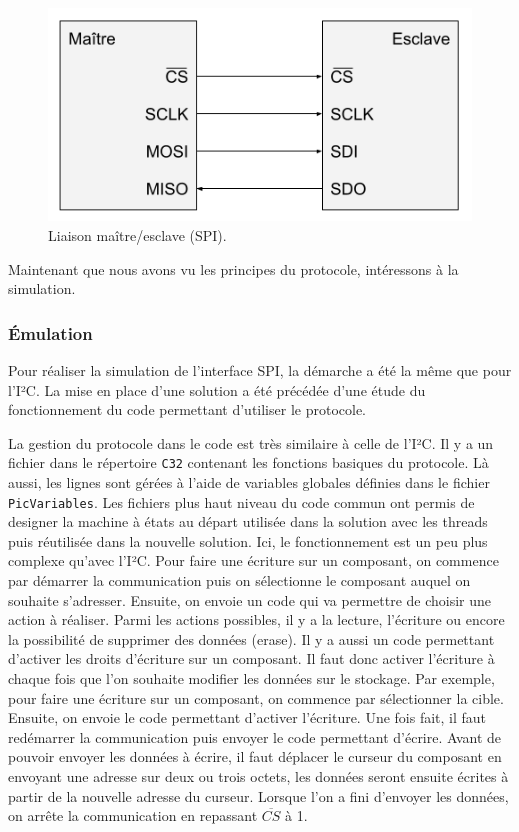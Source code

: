 \documentclass[a4paper]{article}
\begin{document}
\begin{figure}[h!]
  \begin{center}
    \includegraphics[scale=0.6]{./img/schema-spi.png}
    \caption{Liaison maître/esclave (SPI).}
    \label{fig:schemaspi}
  \end{center}
\end{figure}

Maintenant que nous avons vu les principes du protocole, intéressons à la
simulation.

\subsubsection*{Émulation}

Pour réaliser la simulation de l'interface SPI, la démarche a été la même que
pour l'I²C. La mise en place d'une solution a été précédée d'une étude du
fonctionnement du code permettant d'utiliser le protocole.

La gestion du protocole dans le code est très similaire à celle de l'I²C. Il y a
un fichier dans le répertoire \verb|C32| contenant les fonctions basiques
du protocole. Là aussi, les lignes sont gérées à l'aide de variables globales
définies dans le fichier \verb|PicVariables|. Les fichiers plus haut niveau
du code commun ont permis de designer la machine à états au départ utilisée dans
la solution avec les threads puis réutilisée dans la nouvelle solution. Ici, le
fonctionnement est un peu plus complexe qu'avec l'I²C. Pour faire une écriture
sur un composant, on commence par démarrer la communication puis on sélectionne
le composant auquel on souhaite s'adresser. Ensuite, on envoie un code qui va
permettre de choisir une action à réaliser. Parmi les actions possibles, il y a
la lecture, l'écriture ou encore la possibilité de supprimer des données
(erase). Il y a aussi un code permettant d'activer les droits d'écriture sur un
composant. Il faut donc activer l'écriture à chaque fois que l'on souhaite
modifier les données sur le stockage. Par exemple, pour faire une écriture sur
un composant, on commence par sélectionner la cible. Ensuite, on envoie le code
permettant d'activer l'écriture. Une fois fait, il faut redémarrer la
communication puis envoyer le code permettant d'écrire. Avant de pouvoir envoyer
les données à écrire, il faut déplacer le curseur du composant en envoyant une
adresse sur deux ou trois octets, les données seront ensuite écrites à partir de
la nouvelle adresse du curseur. Lorsque l'on a fini d'envoyer les données, on
arrête la communication en repassant $\overline{CS}$ à 1.
\end{document}
